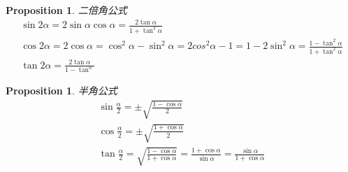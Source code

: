 \documentclass{article}
\newtheorem{proposition}[theorem]{Proposition}
\begin{document}
\begin{proposition}
\rm 二倍角公式
$$
\begin{array}{ll}
\sin 2\alpha = 2\sin \alpha \cos \alpha = \frac{2\tan \alpha}{1 + \tan^2 \alpha}\\
\cos 2\alpha = 2\cos \alpha = \cos^2 \alpha - \sin^2 \alpha =  2cos^2\alpha - 1 = 1 - 2\sin^2 \alpha  = \frac{1-\tan^2 \alpha}{1 + \tan^2\alpha}\\
\tan 2\alpha = \frac{2\tan\alpha}{1-\tan^\alpha}
\end{array}
$$
\end{proposition}

\begin{proposition}
\rm 半角公式
$$
\begin{array}{ll}
\sin\frac{\alpha}{2} = \pm \sqrt{\frac{1-\cos \alpha}{2}} \\
\cos\frac{\alpha}{2} = \pm \sqrt{\frac{1+\cos \alpha}{2}} \\
\tan\frac{\alpha}{2} = \sqrt{\frac{1-\cos \alpha}{1+\cos \alpha}} = \frac{1+\cos \alpha}{\sin \alpha} = \frac{\sin \alpha}{1+\cos \alpha}\\
\end{array}
$$
\end{proposition}
\end{document}
